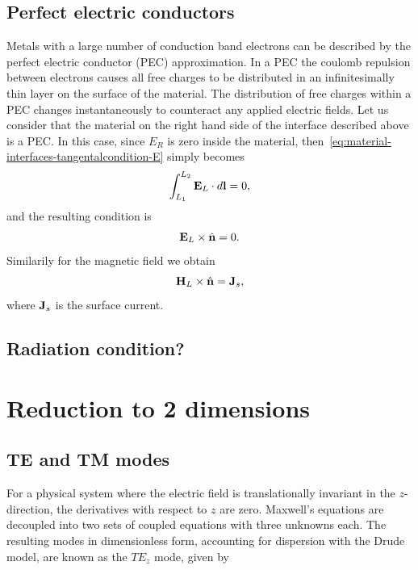 \subsection{Perfect electric conductors}

Metals with a large number of conduction band electrons can be described by the perfect electric conductor (PEC) approximation. In a PEC the coulomb repulsion between electrons causes all free charges to be distributed in an infinitesimally thin layer on the surface of the material. The distribution of free charges within a PEC changes instantaneously to counteract any applied electric fields. Let us consider that the material on the right hand side of the interface described above is a PEC. In this case, since $E_R$ is zero inside the material, then~\eqref{eq:material-interfaces-tangentalcondition-E} simply becomes
$$
\int_{L_1}^{L_2} \mathbf{E}_L \cdot d\mathbf{l} = 0 ,
$$
and the resulting condition is
$$
\mathbf{E}_L \times \hat{\mathbf{n}} = 0 .
$$
Similarily for the magnetic field we obtain
$$
\mathbf{H}_L \times \hat{\mathbf{n}} = \mathbf{J}_s ,
$$
where $\mathbf{J}_s$ is the surface current.

\subsection{Radiation condition?}

\section{Reduction to 2 dimensions}

\subsection{TE and TM modes}
For a physical system where the electric field is translationally invariant in the $z$-direction, the derivatives with respect to $z$ are zero. Maxwell's equations are decoupled into two sets of coupled equations with three unknowns each. The resulting modes in dimensionless form, accounting for dispersion with the Drude model, are known as the $TE_z$ mode, given by

